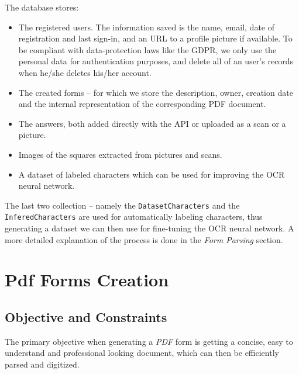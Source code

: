 \documentclass[12pt, a4paper]{report}
\def\code#1{\texttt{#1}}
\begin{document}
The database stores:
\begin{itemize}
    \item The registered users. The information saved is the name, email, date of registration and last sign-in, and an URL to a profile picture if available. To be compliant with data-protection laws like the GDPR, we only use the personal data for authentication purposes, and delete all of an user's records when he/she deletes his/her account.
    \item The created forms -- for which we store the description, owner, creation date and the internal representation of the corresponding PDF document.
    \item The answers, both added directly with the API or uploaded as a scan or a picture.
    \item Images of the squares extracted from pictures and scans.
    \item A dataset of labeled characters which can be used for improving the OCR neural network.
\end{itemize}


The last two collection -- namely the \code{DatasetCharacters} and the \code{InferedCharacters} are used for automatically labeling characters, thus generating a dataset we can then use for fine-tuning the OCR neural network. A more detailed explanation of the process is done in the \textit{Form Parsing} section.


\chapter{Pdf Forms Creation}

\section{Objective and Constraints}

The primary objective when generating a \textit{PDF} form is getting a concise, easy to understand and professional looking document, which can then be efficiently parsed and digitized.
\end{document}
